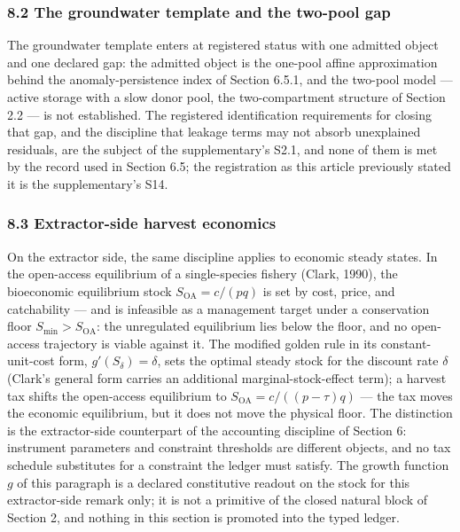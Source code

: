 \documentclass[11pt]{article}
\begin{document}
\subsubsection{8.2 The groundwater template and the two-pool
gap}\label{the-groundwater-template-and-the-two-pool-gap}

The groundwater template enters at registered status with one admitted object and one declared gap: the
admitted object is the one-pool affine approximation behind the anomaly-persistence index of Section 6.5.1, and
the two-pool model --- active storage with a slow donor pool, the two-compartment structure of Section 2.2 ---
is not established. The registered identification requirements for closing that gap, and the discipline that
leakage terms may not absorb unexplained residuals, are the subject of the supplementary's S2.1, and none of
them is met by the record used in Section 6.5; the registration as this article previously stated it is the
supplementary's S14.

\subsubsection{8.3 Extractor-side harvest
economics}\label{extractor-side-harvest-economics}

On the extractor side, the same discipline applies to economic steady
states. In the open-access equilibrium of a single-species fishery
(Clark, 1990), the bioeconomic equilibrium stock
\(S_{\mathrm{OA}} = c/(pq)\) is set by cost, price, and catchability ---
and is infeasible as a management target under a conservation floor
\(S_{\min} > S_{\mathrm{OA}}\): the unregulated equilibrium lies below
the floor, and no open-access trajectory is viable against it. The
modified golden rule in its constant-unit-cost form,
\(g'(S_\delta) = \delta\), sets the optimal steady stock for the
discount rate \(\delta\) (Clark's general form carries an additional
marginal-stock-effect term); a harvest tax shifts the open-access
equilibrium to \(S_{\mathrm{OA}} = c/((p - \tau)q)\) --- the tax moves
the economic equilibrium, but it does not move the physical floor. The
distinction is the extractor-side counterpart of the accounting
discipline of Section 6: instrument parameters and constraint thresholds
are different objects, and no tax schedule substitutes for a constraint
the ledger must satisfy. The growth function \(g\) of this paragraph is
a declared constitutive readout on the stock for this extractor-side
remark only; it is not a primitive of the closed natural block of
Section 2, and nothing in this section is promoted into the typed
ledger.
\end{document}
